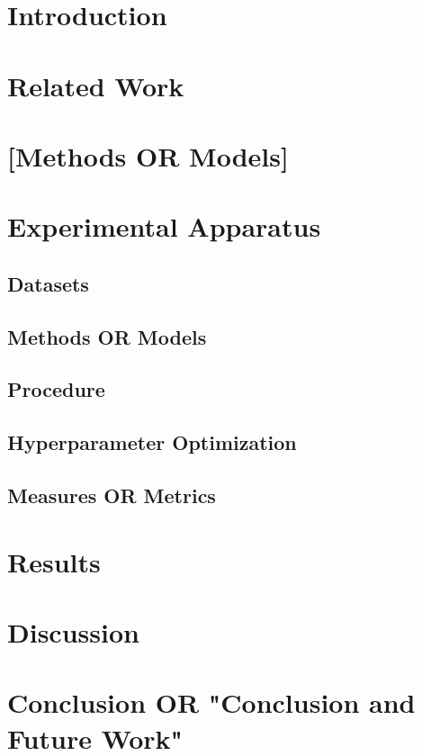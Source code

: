 \documentclass[11pt,a4paper]{article} %
\begin{document}
    \tableofcontents
    \begin{abstract}
    \end{abstract}

    \section{Introduction}
    
    \section{Related Work}

    \section{[Methods OR Models]}

    \section{Experimental Apparatus}
        \subsection{Datasets}
        \subsection{Methods OR Models}
        \subsection{Procedure}
        \subsection{Hyperparameter Optimization}
        \subsection{Measures OR Metrics}

    \section{Results}

    \section{Discussion}

    \section{Conclusion OR "Conclusion and Future Work"}
\end{document}
